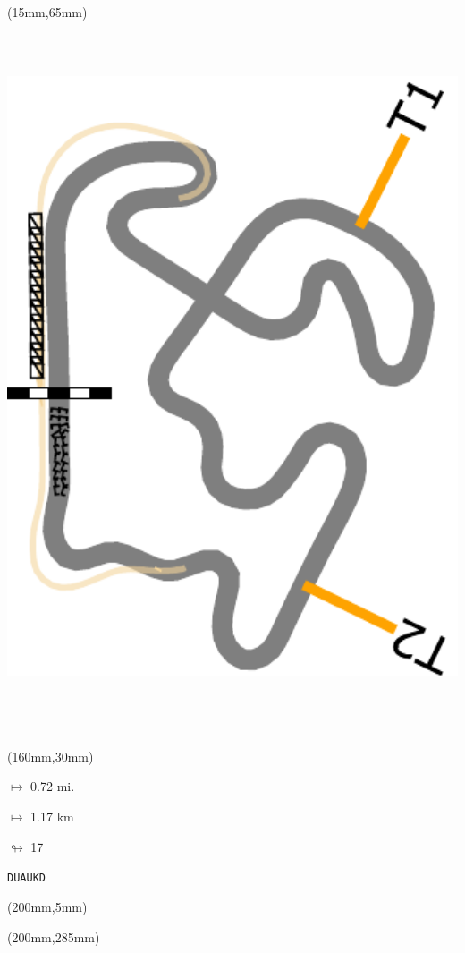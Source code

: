 \begin{textblock*}{185mm}(15mm,65mm)%
\centering
\mbox{\includegraphics[width=185mm,height=210mm,keepaspectratio]{PT/DUAUKD.pdf}}
\end{textblock*}
\begin{textblock*}{40mm}(160mm,30mm)%
\Large
\par$\mapsto$ 0.72 mi.
\par$\mapsto$ 1.17 km
\par$\looparrowright$ 17
\par\hfill\tiny\tt DUAUKD\\
\end{textblock*}
\begin{textblock*}{20mm}(200mm,5mm)%
\fbox{\thepage}
\label{DUAUKD}
\end{textblock*}
\begin{textblock*}{20mm}(200mm,285mm)%
\fbox{\thepage}
\end{textblock*}


